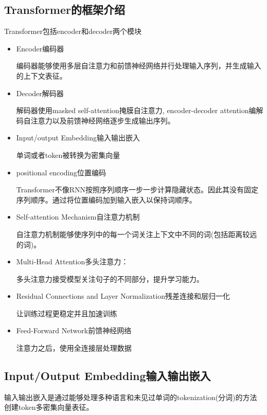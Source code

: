 \documentclass[UTF8]{ctexart}
\begin{document}
\subsection{Transformer的框架介绍}
Transformer包括encoder和decoder两个模块
\begin{itemize}
    \item Encoder编码器
    
    编码器能够使用多层自注意力和前馈神经网络并行处理输入序列，并生成输入的上下文表征。

    \item Decoder解码器
    
    解码器使用masked self-attention掩膜自注意力, encoder-decoder attention编解码自注意力以及前馈神经网络逐步生成输出序列。

    \item Input/output Embedding输入输出嵌入
    
    单词或者token被转换为密集向量

    \item positional encoding位置编码
    
    Transformer不像RNN按照序列顺序一步一步计算隐藏状态。因此其没有固定序列顺序。通过将位置编码加到输入嵌入以保持词顺序。

    \item Self-attention Mechanism自注意力机制
    
    自注意力机制能够使序列中的每一个词关注上下文中不同的词(包括距离较远的词)。

    \item Multi-Head Attention多头注意力：
    
    多头注意力接受模型关注句子的不同部分，提升学习能力。

    \item Residual Connections and Layer Normalization残差连接和层归一化
    
    让训练过程更稳定并且加速训练

    \item Feed-Forward Network前馈神经网络
    
    注意力之后，使用全连接层处理数据

\end{itemize}

\subsection{Input/Output Embedding输入输出嵌入}

输入输出嵌入是通过能够处理多种语言和未见过单词的tokenization(分词)的方法创建token多密集向量表征。
\end{document}
